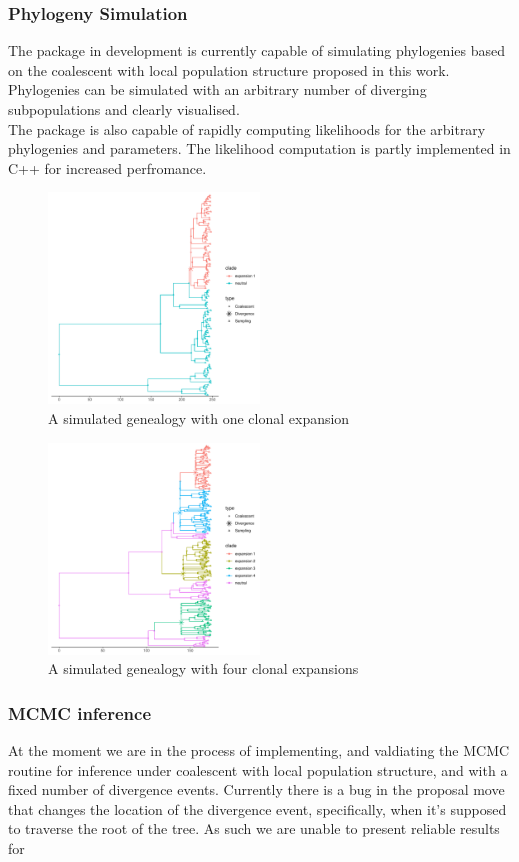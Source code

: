 \documentclass{ieeeaccess}
\theoremstyle{definition}
\begin{document}
\subsubsection{Phylogeny Simulation}
The package in development is currently capable of simulating phylogenies based on the coalescent with local population structure proposed in this work. 
Phylogenies can be simulated with an arbitrary number of diverging subpopulations and clearly visualised.\\
The package is also capable of rapidly computing likelihoods for the arbitrary phylogenies and parameters. The likelihood computation is partly implemented in C++ for increased perfromance. 
\begin{figure}[H]
  \centering
     \includegraphics[width=0.5\textwidth]{../R/tree_structured}
    \caption{A simulated genealogy with one clonal expansion}
\end{figure}
\begin{figure}[H]
  \centering
     \includegraphics[width=0.5\textwidth]{../R/2events/tree_structured}
    \caption{A simulated genealogy with four clonal expansions}
\end{figure}
\subsubsection{MCMC inference}
At the moment we are in the process of implementing, and valdiating the MCMC routine for inference under coalescent with local population structure, and with a fixed number of divergence events. Currently there is a bug in the proposal move that changes the location of the divergence event, specifically, when it's supposed to traverse the root of the tree. As such we are unable to present reliable results for 
\end{document}
